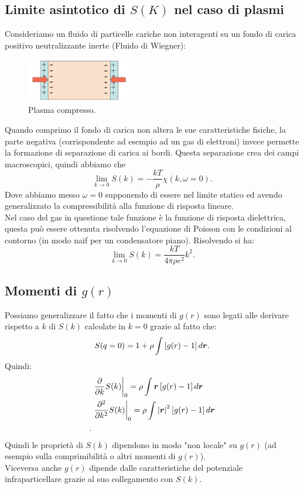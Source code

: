 \subsection{Limite asintotico di $S(K)$ nel caso di plasmi}
\label{subsec:Limite asintotico di $S(K)$ nel caso di plasmi}
Consideriamo un fluido di particelle cariche non interagenti su un fondo di carica positivo neutralizzante inerte (Fluido di Wiegner):
\begin{figure}[H]
	\centering
	\includegraphics[width=0.4\textwidth]{figures/Plasma-schiacciato.png}
	\caption{Plasma compresso.}
	\label{fig:figures-Plasma-schiacciato-png}
\end{figure}
Quando comprimo il fondo di carica non altera le sue caratteristiche fisiche, la parte negativa (corrispondente ad esempio ad un gas di elettroni) invece permette la formazione di separazione di carica ai bordi. Questa separazione crea dei campi macroscopici, quindi abbiamo che
\[
	\lim_{k \to 0} S(k) = -\frac{kT}{\rho }\chi(k, \omega = 0)
.\] 
Dove abbiamo messo $\omega = 0$ supponendo di essere nel limite statico ed avendo generalizzato la compressibilità alla funzione di risposta lineare.\\
Nel caso del gas in questione tale funzione è la funzione di risposta dielettrica, questa può essere ottenuta risolvendo l'equazione di Poisson con le condizioni al contorno (in modo naif per un condensatore piano). Risolvendo si ha:
\[
	\lim_{k \to 0} S(k) = \frac{kT}{4\pi\rho e^2}k^2
.\] 
\subsection{Momenti di $g(r)$}
\label{subsec:Momenti di $g(r)$$}
Possiamo generalizzare il fatto che i momenti di $g(r)$ sono legati alle derivare rispetto a $k$ di $S(k)$ calcolate in $k=0$ grazie al fatto che:
\[
	S(q=0)=1+\rho \int\left[ g(r)-1 \right] d \v{r}
.\] 
Quindi:
\[\begin{aligned}
	&\left.\frac{\partial }{\partial k} S(k)\right|_{0}
		= \rho \int \v{r} \left[ g(r)-1 \right] d \v{r}\\
	&\left.\frac{\partial^2 }{\partial k^2} S(k)\right|_{0}
		= \rho \int \left| \v{r} \right| ^2 \left[ g(r)-1 \right] d \v{r}\\
.\end{aligned}\]
Quindi le proprietà di $S(k)$ dipendono in modo "non locale" su $g(r)$ (ad esempio sulla comprimibilità o altri momenti di $g(r)$).\\
Viceversa anche $g(r)$ dipende dalle caratteristiche del potenziale infraparticellare grazie al suo collegamento con $S(k)$.

